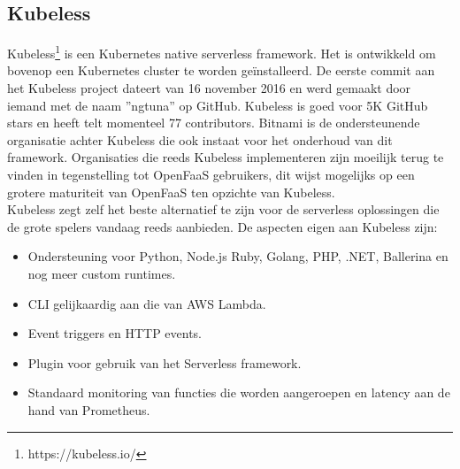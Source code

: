 \subsection{Kubeless}
Kubeless\footnote{https://kubeless.io/} is een Kubernetes native serverless framework. Het is ontwikkeld om bovenop een Kubernetes cluster te worden geïnstalleerd. De eerste commit aan het Kubeless project dateert van 16 november 2016 en werd gemaakt door iemand met de naam ''ngtuna'' op GitHub. Kubeless is goed voor 5K GitHub stars en heeft telt momenteel 77 contributors. Bitnami is de ondersteunende organisatie achter Kubeless die ook instaat voor het onderhoud van dit framework. Organisaties die reeds Kubeless implementeren zijn moeilijk terug te vinden in tegenstelling tot OpenFaaS gebruikers, dit wijst mogelijks op een grotere maturiteit van OpenFaaS ten opzichte van Kubeless. 
\\
Kubeless zegt zelf het beste alternatief te zijn voor de serverless oplossingen die de grote spelers vandaag reeds aanbieden. De aspecten eigen aan Kubeless zijn:
\begin{itemize}
    \item Ondersteuning voor Python, Node.js Ruby, Golang, PHP, .NET, Ballerina en nog meer custom runtimes.
    \item CLI gelijkaardig aan die van AWS Lambda.
    \item Event triggers en HTTP events.
    \item Plugin voor gebruik van het Serverless framework. \autocite{Serverless2018}
    \item Standaard monitoring van functies die worden aangeroepen en latency aan de hand van Prometheus.
\end{itemize}

